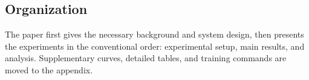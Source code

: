 \subsection{Organization}

The paper first gives the necessary background and system design, then presents the experiments in the conventional order: experimental setup, main results, and analysis. Supplementary curves, detailed tables, and training commands are moved to the appendix.
